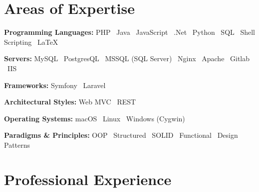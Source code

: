 \documentclass[a4paper,10pt]{article}
\begin{document}
\section*{Areas of Expertise}
\begin{minipage}{\textwidth}
\raggedright

\textbf{Programming Languages:} PHP \textbar\ Java \textbar\ JavaScript \textbar\ .Net \textbar\ Python \textbar\ SQL \textbar\ Shell Scripting \textbar\ \LaTeX

\textbf{Servers:} MySQL \textbar\ PostgresQL \textbar\ MSSQL (SQL Server) \textbar\ Nginx \textbar\ Apache \textbar\ Gitlab \textbar\ IIS

\textbf{Frameworks:} Symfony \textbar\ Laravel

\textbf{Architectural Styles:} Web MVC \textbar\ REST

\textbf{Operating Systems:} macOS \textbar\ Linux \textbar\ Windows (Cygwin)

\textbf{Paradigms \& Principles:} OOP \textbar\ Structured \textbar\ SOLID \textbar\ Functional \textbar\ Design Patterns

\end{minipage}

\section*{Professional Experience}
\end{document}
